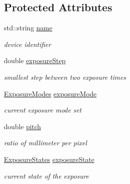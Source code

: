 \subsection*{Protected Attributes}
\begin{DoxyCompactItemize}
\item 
\mbox{\label{classGenericCamera_a12b86f8137447dd8af1864eb9bb062ee}} 
std\+::string \hyperlink{classGenericCamera_a12b86f8137447dd8af1864eb9bb062ee}{name}
\begin{DoxyCompactList}\small\item\em device identifier \end{DoxyCompactList}\item 
\mbox{\label{classGenericCamera_a1d0a61c9839147adaa86e9c456e3ce0c}} 
double \hyperlink{classGenericCamera_a1d0a61c9839147adaa86e9c456e3ce0c}{exposure\+Step}
\begin{DoxyCompactList}\small\item\em smallest step between two exposure times \end{DoxyCompactList}\item 
\mbox{\label{classGenericCamera_af73c8a9c6218780d50bda3a835d16770}} 
\hyperlink{constants_8h_a6e920987695b1da6e2df4e41dc867e18}{Exposure\+Modes} \hyperlink{classGenericCamera_af73c8a9c6218780d50bda3a835d16770}{exposure\+Mode}
\begin{DoxyCompactList}\small\item\em current exposure mode set \end{DoxyCompactList}\item 
\mbox{\label{classGenericCamera_a565f94ee10ad6333ca6e59a2fe8d32bb}} 
double \hyperlink{classGenericCamera_a565f94ee10ad6333ca6e59a2fe8d32bb}{pitch}
\begin{DoxyCompactList}\small\item\em ratio of millimeter per pixel \end{DoxyCompactList}\item 
\mbox{\label{classGenericCamera_a92600846c7691baabbc78af3b6e1cb67}} 
\hyperlink{constants_8h_ae9749bac8d6973b92725af092d0a76bc}{Exposure\+States} \hyperlink{classGenericCamera_a92600846c7691baabbc78af3b6e1cb67}{exposure\+State}
\begin{DoxyCompactList}\small\item\em current state of the exposure \end{DoxyCompactList}\end{DoxyCompactItemize}


